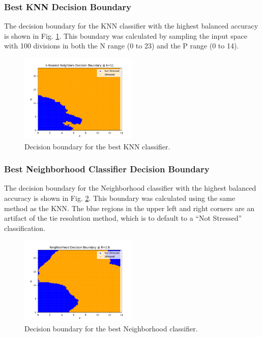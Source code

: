 \documentclass[a4paper, 11pt, titlepage]{article}
\newcommand{\figRef}[1]{Fig. \ref{#1}}
\begin{document}
  \subsubsection{Best KNN Decision Boundary}
  \par The decision boundary for the KNN classifier with the highest balanced
  accuracy is shown in \figRef{fig:knn_dec}.
  This boundary was calculated by sampling the input space with 100 divisions
  in both the N range (0 to 23) and the P range (0 to 14).
  \begin{figure}[htb]
    \centering
    \includegraphics[width=0.5\textwidth]{images/knn_dec_bound.png}
    \caption{Decision boundary for the best KNN classifier.}
    \label{fig:knn_dec}
  \end{figure}
  \subsubsection{Best Neighborhood Classifier Decision Boundary}
  \par The decision boundary for the Neighborhood classifier with the highest
  balanced accuracy is shown in \figRef{fig:neighborhood_dec}.
  This boundary was calculated using the same method as the KNN.
  The blue regions in the upper left and right corners are an artifact of the
  tie resolution method, which is to default to a ``Not Stressed''
  classification.
  \begin{figure}[htb]
    \center
    \includegraphics[width=0.5\textwidth]{images/neighborhood_dec_bound.png}
    \caption{Decision boundary for the best Neighborhood classifier.}
    \label{fig:neighborhood_dec}
  \end{figure}
\end{document}
